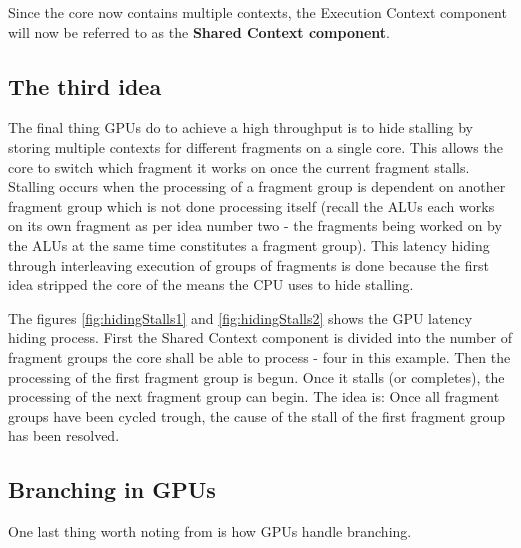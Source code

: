 Since the core now contains multiple contexts, the Execution Context component will now be referred to as the \textbf{Shared Context component}.

\subsection{The third idea}
The final thing \glspl{GPU} do to achieve a high throughput is to hide stalling by storing multiple contexts for different fragments on a single core. 
This allows the core to switch which fragment it works on once the current fragment stalls.
Stalling occurs when the processing of a fragment group is dependent on another fragment group which is not done processing itself (recall the \glspl{ALU} each works on its own fragment as per idea number two - the fragments being worked on by the \glspl{ALU} at the same time constitutes a fragment group).
This latency hiding through interleaving execution of groups of fragments is done because the first idea  stripped the core of the means the \gls{CPU} uses to hide stalling.



The figures \ref{fig:hidingStalls1} and \ref{fig:hidingStalls2} shows the \gls{GPU} latency hiding process.
First the Shared Context component is divided into the number of fragment groups the core shall be able to process - four in this example.
Then the processing of the first fragment group is begun. 
Once it stalls (or completes), the processing of the next fragment group can begin.
The idea is: Once all fragment groups have been cycled trough, the cause of the stall of the first fragment group has been resolved.

\subsection{Branching in \glspl{GPU}}
One last thing worth noting from \cite{intro_to_gpu_arch} is how \glspl{GPU} handle branching.


